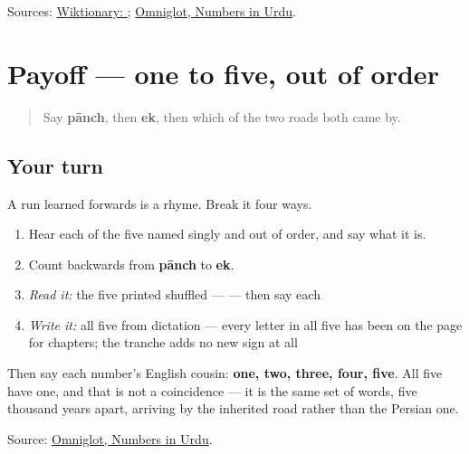 \begin{tcolorbox}[breakable,colback=teal!4,colframe=teal!35!black,title={Before you move on}]
Sources: \href{https://en.wiktionary.org/wiki/\%D9\%BE\%D8\%A7\%D9\%86\%DA\%86}{Wiktionary: }; \href{https://www.omniglot.com/language/numbers/urdu.htm}{Omniglot, Numbers in Urdu}.
\end{tcolorbox}
\section[Practice]{Payoff — one to five, out of order}

\label{lesson:UR-C28-practice}



\begin{quote}
Say \textbf{pānch}, then \textbf{ek}, then which of the two roads both came by.
\end{quote}

\subsection*{Your turn}
A run learned forwards is a rhyme. Break it four ways.

\begin{enumerate}
\raggedright
  \item Hear each of the five named singly and out of order, and say what it is.
  \item Count backwards from \textbf{pānch} to \textbf{ek}.
  \item \emph{Read it:} the five printed shuffled — \textbf{    } — then say each
  \item \emph{Write it:} all five from dictation — every letter in all five has been on the page for chapters; the tranche adds no new sign at all
\end{enumerate}

Then say each number's English cousin: \textbf{one, two, three, four, five}. All five have one, and that is not a coincidence — it is the same set of words, five thousand years apart, arriving by the inherited road rather than the Persian one.

\begin{tcolorbox}[breakable,colback=teal!4,colframe=teal!35!black,title={Before you move on}]
Source: \href{https://www.omniglot.com/language/numbers/urdu.htm}{Omniglot, Numbers in Urdu}.
\end{tcolorbox}
